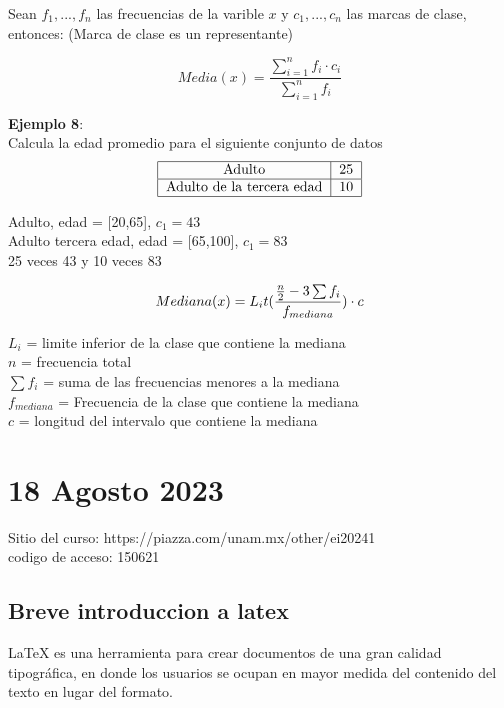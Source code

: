 \documentclass[11pt, a4paper]{report}
\begin{document}
Sean $f_1, ... , f_n$ las frecuencias de la varible $x$ y $c_1, ... , c_n$ las marcas de clase, entonces: (Marca de clase es un representante)

\[
    Media(x) = \frac{\sum^{n}_{i=1}f_i \cdot c_i}{\sum^{n}_{i=1}f_i}
\]

\textbf{Ejemplo 8}: \\
Calcula la edad promedio para el siguiente conjunto de datos
\[
    \begin{tabular}{|c|c|}
        \hline
        Adulto                    & 25 \\
        \hline
        Adulto de la tercera edad & 10 \\
        \hline
    \end{tabular}
\]

Adulto, edad = [20,65], $c_1 = 43$ \\
Adulto tercera edad, edad = [65,100], $c_1 = 83$\\

25 veces 43 y 10 veces 83

\[
    Mediana(x) = L_{i} t(\frac{\frac{n}{2} - 3 \sum f_i}{f_{mediana}}) \cdot c \\ \\
\]

\noindent $L_i$ = limite inferior de la clase que contiene la mediana\\
$n$ = frecuencia total \\
$\sum f_i$ = suma de las frecuencias menores a la mediana\\
$f_{mediana}$ = Frecuencia de la clase que contiene la mediana\\
$c$ = longitud del intervalo que contiene la mediana \\

\newpage

\section{18 Agosto 2023}

Sitio del curso: https://piazza.com/unam.mx/other/ei20241 \\
codigo de acceso: 150621

\subsection{Breve introduccion a latex}

LaTeX es una herramienta para crear documentos de una gran
calidad tipográfica, en donde los usuarios se ocupan en mayor
medida del contenido del texto en lugar del formato.
\end{document}
